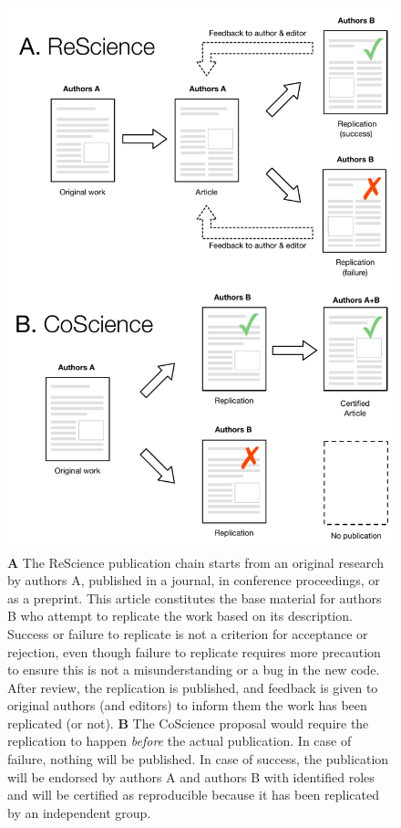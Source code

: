 \documentclass[a4paper,10pt, twocolumn]{article}
\begin{document}
\begin{figure}
  \includegraphics[width=1.0\columnwidth]{CoScience}
  \caption{\textbf{A} The ReScience publication chain starts from an
    original research by authors A, published in a journal, in
    conference proceedings, or as a preprint. This article constitutes
    the base material for authors B who attempt to replicate the work
    based on its description. Success or failure to replicate is not a
    criterion for acceptance or rejection, even though failure to
    replicate requires more precaution to ensure this is not a
    misunderstanding or a bug in the new code. After review, the
    replication is published, and feedback is given to original
    authors (and editors) to inform them the work has been replicated
    (or not). \textbf{B} The CoScience proposal would require the
    replication to happen \textit{before} the actual publication. In
    case of failure, nothing will be published. In case of success,
    the publication will be endorsed by authors A and authors B with
    identified roles and will be certified as reproducible because it
    has been replicated by an independent group.}
  \label{fig:coscience}
\end{figure}
\end{document}
